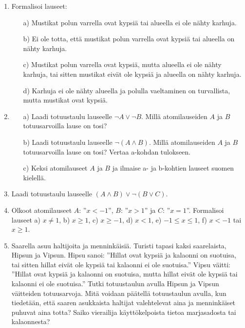 \begin{enumerate}
\item Formalisoi lauseet:
\begin{itemize}
\item[a)] Mustikat polun varrella ovat kypsiä tai
alueella ei ole nähty karhuja.
\item[b)] Ei ole totta, että mustikat polun varrella ovat
kypsiä tai alueella on nähty karhuja.
\item[c)] Mustikat polun varrella ovat kypsiä, mutta
alueella ei ole nähty karhuja, tai sitten mustikat eivät
ole kypsiä ja alueella on nähty karhuja.
\item[d)] Karhuja ei ole nähty alueella ja polulla
vaeltaminen on turvallista, mutta mustikat ovat kypsiä.
\end{itemize}

\item
\begin{itemize}
\item[a)] Laadi totuustaulu lauseelle $\lnot A\lor \lnot
B$. Millä atomilauseiden $A$ ja $B$ totuusarvoilla lause
on tosi?
\item[b)] Laadi totuustaulu lauseelle $\lnot(A\land B)$.
Millä atomilauseiden $A$ ja $B$ totuusarvoilla lause on
tosi? Vertaa a-kohdan tulokseen.
\item[c)] Keksi atomilauseet $A$ ja $B$ ja ilmaise a- ja
b-kohtien lauseet suomen kielellä.
\end{itemize}

\item Laadi totuustaulu lauseelle $(A\land B)\lor \lnot (B\lor C)$.

\item Olkoot atomilauseet $A$: ''$x < -1$'', $B$: ''$x > 1$''  ja $C$: ''$x = 1$''. Formalisoi  lauseet  
a)  $x\neq 1$,   b) $x \ge 1$,   c)  $x \ge -1$,  d)  $x < 1$,  e)  $-1 \le x \le  1$, 
f) $x <  -1$ tai $x  \ge 1$.        

\item
Saarella asuu haltijoita ja menninkäisiä. Turisti tapasi kaksi saarelaista, Hipsun ja Vipsun. Hipsu sanoi: ''Hillat ovat kypsiä ja kalaonni on suotuisa, tai sitten hillat eivät ole kypsiä tai kalaonni ei ole suotuisa.'' Vipsu väitti: ''Hillat ovat kypsiä ja kalaonni on suotuisa, mutta hillat eivät ole kypsiä tai kalaonni ei ole suotuisa.'' Tutki totuustaulun avulla Hipsun ja Vipsun väitteiden totuusarvoja. Mitä voidaan päätellä totuustaulun avulla, kun tiedetään, että saaren asukkaista haltijat valehtelevat aina ja menninkäiset puhuvat aina totta? Saiko vierailija käyttökelpoista tietoa marjasadosta tai kalaonnesta?



\end{enumerate}

